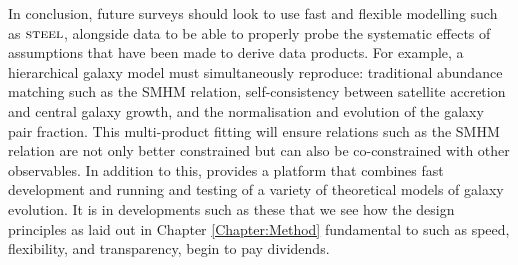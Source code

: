 In conclusion, future surveys should look to use fast and flexible modelling such as $\textsc{steel}$, alongside data to be able to properly probe the systematic effects of assumptions that have been made to derive data products. For example, a hierarchical galaxy model must simultaneously reproduce: traditional abundance matching such as the SMHM relation, self-consistency between satellite accretion and central galaxy growth, and the normalisation and evolution of the galaxy pair fraction. This multi-product fitting will ensure relations such as the SMHM relation are not only better constrained but can also be co-constrained with other observables. In addition to this, \steel provides a platform that combines fast development and running and testing of a variety of theoretical models of galaxy evolution. It is in developments such as these that we see how the design principles as laid out in Chapter \ref{Chapter:Method} fundamental to \steel such as speed, flexibility, and transparency, begin to pay dividends.
